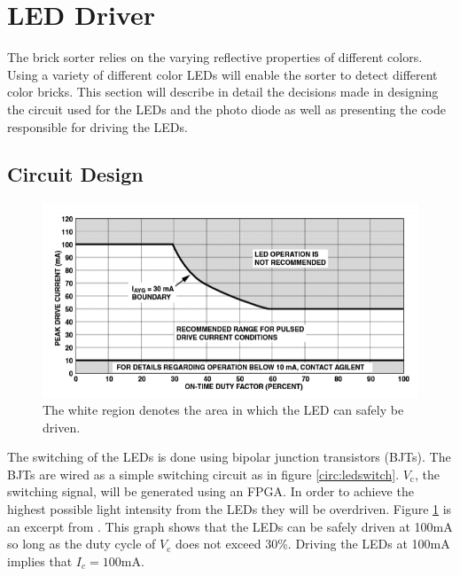 \section{LED Driver}
The brick sorter relies on the varying reflective properties of different colors. Using a variety of different color LEDs will enable the sorter to detect different color bricks. This section will describe in detail the decisions made in designing the circuit used for the LEDs and the photo diode as well as presenting the code responsible for driving the LEDs. 

\subsection{Circuit Design}
\begin{figure}[h!]
	\begin{center}
		\includegraphics[width=\linewidth]{images/overdrive}
	\end{center}
	\caption{The white region denotes the area in which the LED can safely be driven.}
	\label{fig:overdrive}
\end{figure}
The switching of the LEDs is done using bipolar junction transistors (BJTs). The BJTs are wired as a simple switching circuit as in figure \ref{circ:ledswitch}. $V_{\text{c}}$, the switching signal, will be generated using an FPGA.
In order to achieve the highest possible light intensity from the LEDs they will be overdriven. Figure \ref{fig:overdrive} is an excerpt from \cite{avago}. This graph shows that the LEDs can be safely driven at 100mA so long as the duty cycle of $V_{\text{c}}$ does not exceed 30\%. Driving the LEDs at 100mA implies that $I_c=100\text{mA}$. 

